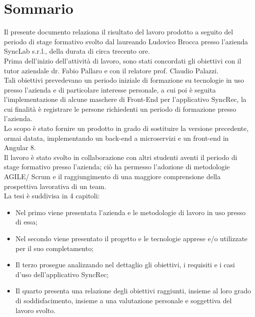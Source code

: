 
\cleardoublepage
{}
{}
\begingroup
\let\clearpage\relax
\let\cleardoublepage\relax
\let\cleardoublepage\relax

\chapter*{Sommario}

Il presente documento relaziona il risultato del lavoro prodotto a seguito del periodo di stage formativo svolto dal laureando Ludovico Brocca presso l'azienda SyncLab s.r.l., della durata di circa trecento ore.\\
Prima dell'inizio dell'attività di lavoro, sono stati concordati gli obiettivi con il tutor aziendale dr. Fabio Pallaro e con il relatore prof. Claudio Palazzi.\\
Tali obiettivi prevedevano un periodo iniziale di formazione su tecnologie in uso presso l'azienda e di particolare interesse personale, a cui poi è seguita l'implementazione di alcune maschere di Front-End per l'applicativo SyncRec, la cui finalità è registrare le persone richiedenti un periodo di formazione presso l'azienda.\\
Lo scopo è stato fornire un prodotto in grado di sostituire la versione precedente, ormai datata, implementando un back-end a microservizi e un front-end in Angular 8.\\
Il lavoro è stato svolto in collaborazione con altri studenti aventi il periodo di stage formativo presso l'azienda; ciò ha permesso l'adozione di metodologie AGILE/ Scrum e il raggiungimento di una maggiore comprensione della prospettiva lavorativa di un team.\\
La tesi è suddivisa in 4 capitoli:
\begin{itemize}
	\item Nel primo viene presentata l'azienda e le metodologie di lavoro in uso presso di essa;
	\item Nel secondo viene presentato il progetto e le tecnologie apprese e/o utilizzate per il suo completamento;
	\item Il terzo prosegue analizzando nel dettaglio gli obiettivi, i requisiti e i casi d'uso dell'applicativo SyncRec; 
	\item Il quarto presenta una relazione degli obiettivi raggiunti, insieme al loro grado di soddisfacimento, insieme a una valutazione personale e soggettiva del lavoro svolto.
\end{itemize}
